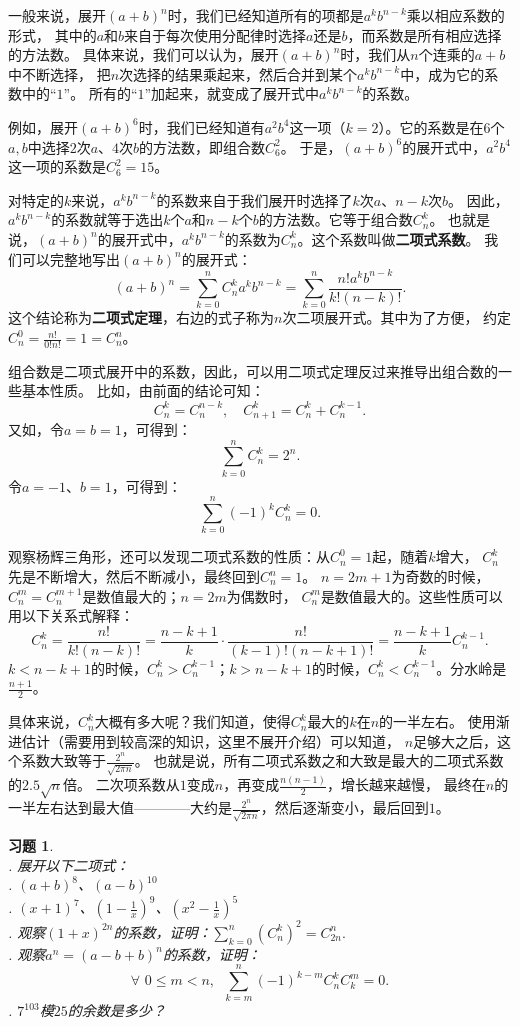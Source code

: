 \documentclass[12pt,UTF8]{ctexbook}
\newtheorem{xt}{习题}[section]
\begin{document}
一般来说，展开$(a+b)^n$时，我们已经知道所有的项都是$a^kb^{n-k}$乘以相应系数的形式，
其中的$a$和$b$来自于每次使用分配律时选择$a$还是$b$，而系数是所有相应选择的方法数。
具体来说，我们可以认为，展开$(a+b)^n$时，我们从$n$个连乘的$a+b$中不断选择，
把$n$次选择的结果乘起来，然后合并到某个$a^kb^{n-k}$中，成为它的系数中的“$1$”。
所有的“$1$”加起来，就变成了展开式中$a^kb^{n-k}$的系数。

例如，展开$(a+b)^6$时，我们已经知道有$a^2b^4$这一项（$k=2$）。它的系数是在$6$个$a,b$中选择$2$次$a$、$4$次$b$的方法数，即组合数$C_6^2$。
于是，$(a+b)^6$的展开式中，$a^2b^4$这一项的系数是$C_6^2 = 15$。

对特定的$k$来说，$a^kb^{n-k}$的系数来自于我们展开时选择了$k$次$a$、$n-k$次$b$。
因此，$a^kb^{n-k}$的系数就等于选出$k$个$a$和$n-k$个$b$的方法数。它等于组合数$C_n^k$。
也就是说，$(a+b)^n$的展开式中，$a^kb^{n-k}$的系数为$C_n^k$。这个系数叫做\textbf{二项式系数}。
我们可以完整地写出$(a+b)^n$的展开式：
$$(a+b)^n = \sum_{k=0}^n C_n^k a^kb^{n-k} = \sum_{k=0}^n \frac{n!a^kb^{n-k}}{k!(n-k)!} .$$
这个结论称为\textbf{二项式定理}，右边的式子称为$n$次二项展开式。其中为了方便，
约定$C_n^0 = \frac{n!}{0!n!} = 1 = C_n^n$。

组合数是二项式展开中的系数，因此，可以用二项式定理反过来推导出组合数的一些基本性质。
比如，由前面的结论可知：
$$C_n^k = C_n^{n-k}, \quad C_{n+1}^k = C_n^k + C_n^{k-1}.$$
又如，令$a=b=1$，可得到：
$$\sum_{k=0}^n C_n^k = 2^n.$$
令$a=-1$、$b=1$，可得到：
$$\sum_{k=0}^n (-1)^k C_n^k = 0.$$

观察杨辉三角形，还可以发现二项式系数的性质：从$C_n^0=1$起，随着$k$增大，
$C_n^k$先是不断增大，然后不断减小，最终回到$C_n^n = 1$。
$n=2m+1$为奇数的时候，$C_n^m=C_n^{m+1}$是数值最大的；$n=2m$为偶数时，
$C_n^m$是数值最大的。这些性质可以用以下关系式解释：
$$ C_n^k = \frac{n!}{k!(n-k)!} = \frac{n-k+1}{k}\cdot \frac{n!}{(k-1)!(n-k+1)!} = \frac{n-k+1}{k}C_n^{k-1}.$$
$k < n-k+1$的时候，$C_n^k > C_n^{k-1}$；$k > n-k+1$的时候，$C_n^k < C_n^{k-1}$。分水岭是$\frac{n+1}{2}$。

具体来说，$C_n^k$大概有多大呢？我们知道，使得$C_{n}^k$最大的$k$在$n$的一半左右。
使用渐进估计（需要用到较高深的知识，这里不展开介绍）可以知道，
$n$足够大之后，这个系数大致等于$\frac{2^{n}}{\sqrt{2\pi n}}$。
也就是说，所有二项式系数之和大致是最大的二项式系数的$2.5\sqrt{n}$倍。
二次项系数从$1$变成$n$，再变成$\frac{n(n-1)}{2}$，增长越来越慢，
最终在$n$的一半左右达到最大值————大约是$\frac{2^{n}}{\sqrt{2\pi n}}$，然后逐渐变小，最后回到$1$。

\begin{xt}
    \mbox{} \\
    . 展开以下二项式：\\
    . $(a+b)^8$、$(a-b)^{10}$ \\
    . $(x+1)^7$、$(1-\frac{1}{x})^9$、$(x^2-\frac{1}{x})^5$ \\
    . 观察$(1+x)^{2n}$的系数，证明：$\sum_{k=0}^n \left(C_n^k\right)^2 = C_{2n}^n.$ \\
    . 观察$a^n = (a-b+b)^n$的系数，证明：
                $$\forall \,\, 0 \leqslant m < n, \,\,\, \sum_{k=m}^n (-1)^{k-m} C_n^kC_k^m = 0.$$
    . $7^{103}$模$25$的余数是多少？

\end{xt}
\end{document}
